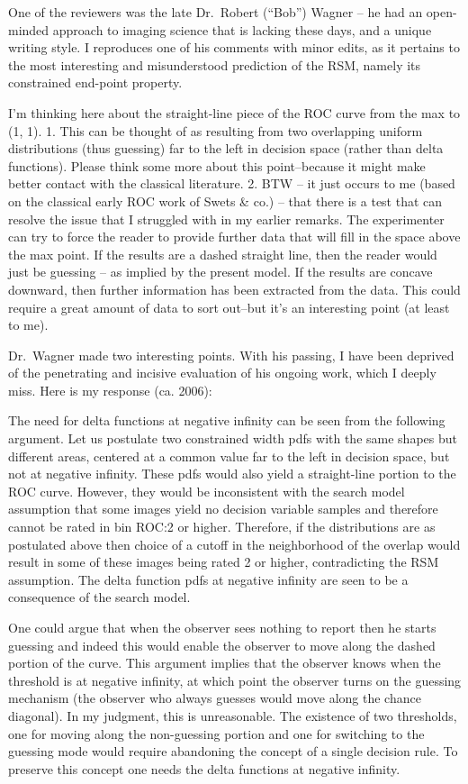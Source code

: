 \documentclass[
]{book}
\begin{document}
One of the reviewers was the late Dr.~Robert (``Bob'') Wagner -- he had an open-minded approach to imaging science that is lacking these days, and a unique writing style. I reproduces one of his comments with minor edits, as it pertains to the most interesting and misunderstood prediction of the RSM, namely its constrained end-point property.

I'm thinking here about the straight-line piece of the ROC curve from the max to (1, 1).
1. This can be thought of as resulting from two overlapping uniform distributions (thus guessing) far to the left in decision space (rather than delta functions). Please think some more about this point--because it might make better contact with the classical literature.
2. BTW -- it just occurs to me (based on the classical early ROC work of Swets \& co.) -- that there is a test that can resolve the issue that I struggled with in my earlier remarks. The experimenter can try to force the reader to provide further data that will fill in the space above the max point. If the results are a dashed straight line, then the reader would just be guessing -- as implied by the present model. If the results are concave downward, then further information has been extracted from the data. This could require a great amount of data to sort out--but it's an interesting point (at least to me).

Dr.~Wagner made two interesting points. With his passing, I have been deprived of the penetrating and incisive evaluation of his ongoing work, which I deeply miss. Here is my response (ca. 2006):

The need for delta functions at negative infinity can be seen from the following argument. Let us postulate two constrained width pdfs with the same shapes but different areas, centered at a common value far to the left in decision space, but not at negative infinity. These pdfs would also yield a straight-line portion to the ROC curve. However, they would be inconsistent with the search model assumption that some images yield no decision variable samples and therefore cannot be rated in bin ROC:2 or higher. Therefore, if the distributions are as postulated above then choice of a cutoff in the neighborhood of the overlap would result in some of these images being rated 2 or higher, contradicting the RSM assumption. The delta function pdfs at negative infinity are seen to be a consequence of the search model.

One could argue that when the observer sees nothing to report then he starts guessing and indeed this would enable the observer to move along the dashed portion of the curve. This argument implies that the observer knows when the threshold is at negative infinity, at which point the observer turns on the guessing mechanism (the observer who always guesses would move along the chance diagonal). In my judgment, this is unreasonable. The existence of two thresholds, one for moving along the non-guessing portion and one for switching to the guessing mode would require abandoning the concept of a single decision rule. To preserve this concept one needs the delta functions at negative infinity.
\end{document}
